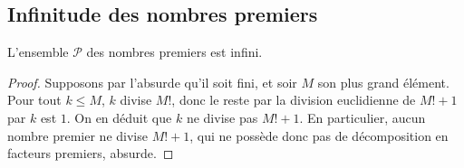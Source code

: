 \subsection{Infinitude des nombres premiers}

\begin{proposition}
L'ensemble $\mathcal P$ des nombres premiers est infini.
\end{proposition}
\begin{proof}
Supposons par l'absurde qu'il soit fini, et soir $M$ son plus grand élément. Pour tout $k\leq M$, $k$ divise $M!$, donc le reste par la division euclidienne de $M!+1$ par $k$ est $1$. On en déduit que $k$ ne divise pas $M!+1$. En particulier, aucun nombre premier ne divise $M!+1$, qui ne possède donc pas de décomposition en facteurs premiers, absurde.
\end{proof}


